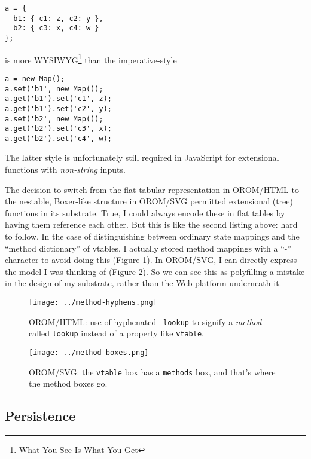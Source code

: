 \begin{lstlisting}
a = {
  b1: { c1: z, c2: y },
  b2: { c3: x, c4: w }
};
\end{lstlisting}

is more WYSIWYG\footnote{What You See Is What You Get} than the
imperative-style

\begin{lstlisting}
a = new Map();
a.set('b1', new Map());
a.get('b1').set('c1', z);
a.get('b1').set('c2', y);
a.set('b2', new Map());
a.get('b2').set('c3', x);
a.get('b2').set('c4', w);
\end{lstlisting}

The latter style is unfortunately still required in JavaScript for
extensional functions with \emph{non-string} inputs.

The decision to switch from the flat tabular representation in OROM/HTML
to the nestable, Boxer-like structure in OROM/SVG permitted extensional
(tree) functions in its substrate. True, I could always encode these in
flat tables by having them reference each other. But this is like the
second listing above: hard to follow. In the case of distinguishing
between ordinary state mappings and the ``method dictionary'' of
vtables, I actually stored method mappings with a ``-'' character to
avoid doing this (Figure \ref{fig:method-hyphens}). In OROM/SVG, I can
directly express the model I was thinking of (Figure
\ref{fig:method-boxes}). So we can see this as polyfilling a mistake in
the design of my substrate, rather than the Web platform underneath it.

\begin{figure}[h]
  \centering
  \texttt{[image: ../method-hyphens.png]}
  \caption{OROM/HTML: use of hyphenated \texttt{-lookup} to signify a \emph{method} called
           \texttt{lookup} instead of a property like \texttt{vtable}. \label{fig:method-hyphens}}
\end{figure}

\begin{figure}[h]
  \centering
  \texttt{[image: ../method-boxes.png]}
  \caption{OROM/SVG: the \texttt{vtable} box has a \texttt{methods} box, and that's where the method boxes go. \label{fig:method-boxes}}
\end{figure}

\hypertarget{persistence}{%
\subsection{Persistence}\label{persistence}}

